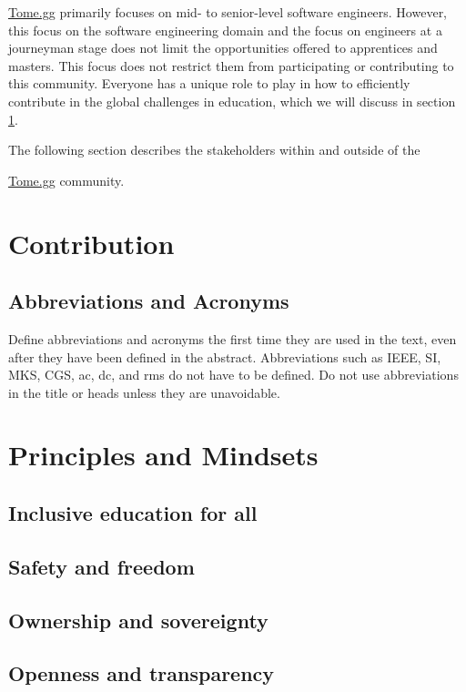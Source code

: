 \documentclass[journal, onecolumn]{IEEEtran}
\newcommand{\tomegg}{
  \href{http://tome.gg}{Tome.gg}
}
\begin{document}
\tomegg primarily focuses on mid- to senior-level software engineers. However, 
this focus on the software engineering domain and the focus on engineers at a
journeyman stage does not limit the opportunities offered to apprentices and 
masters. This focus does not restrict them from participating or contributing 
to this community. Everyone has a unique role to play in how to efficiently 
contribute in the global challenges in education, which we will discuss in 
section \ref{sec:contribution}.

The following section describes the stakeholders within and outside of the
\tomegg community.

\section{Contribution}
\label{sec:contribution}

\subsection{Abbreviations and Acronyms}\label{AA}
Define abbreviations and acronyms the first time they are used in the text, 
even after they have been defined in the abstract. Abbreviations such as 
IEEE, SI, MKS, CGS, ac, dc, and rms do not have to be defined. Do not use 
abbreviations in the title or heads unless they are unavoidable.

\section{Principles and Mindsets}
\label{sec:principles_mindsets}

\subsection{Inclusive education for all}

\subsection{Safety and freedom}

\subsection{Ownership and sovereignty}

\subsection{Openness and transparency}
\end{document}
